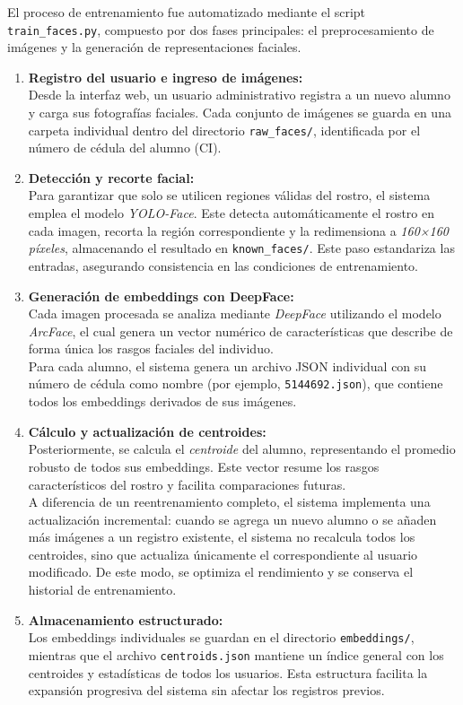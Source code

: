 El proceso de entrenamiento fue automatizado mediante el script \texttt{train\_faces.py}, compuesto por dos fases principales: el preprocesamiento de imágenes y la generación de representaciones faciales.

\begin{enumerate}
    \item \textbf{Registro del usuario e ingreso de imágenes:} \\
    Desde la interfaz web, un usuario administrativo registra a un nuevo alumno y carga sus fotografías faciales. Cada conjunto de imágenes se guarda en una carpeta individual dentro del directorio \texttt{raw\_faces/}, identificada por el número de cédula del alumno (CI).

    \item \textbf{Detección y recorte facial:} \\
    Para garantizar que solo se utilicen regiones válidas del rostro, el sistema emplea el modelo \textit{YOLO-Face}. Este detecta automáticamente el rostro en cada imagen, recorta la región correspondiente y la redimensiona a \textit{160×160 píxeles}, almacenando el resultado en \texttt{known\_faces/}. Este paso estandariza las entradas, asegurando consistencia en las condiciones de entrenamiento.

    \item \textbf{Generación de embeddings con DeepFace:} \\
    Cada imagen procesada se analiza mediante \textit{DeepFace} utilizando el modelo \textit{ArcFace}, el cual genera un vector numérico de características que describe de forma única los rasgos faciales del individuo. \\
    Para cada alumno, el sistema genera un archivo JSON individual con su número de cédula como nombre (por ejemplo, \texttt{5144692.json}), que contiene todos los embeddings derivados de sus imágenes.

    \item \textbf{Cálculo y actualización de centroides:} \\
    Posteriormente, se calcula el \textit{centroide} del alumno, representando el promedio robusto de todos sus embeddings. Este vector resume los rasgos característicos del rostro y facilita comparaciones futuras. \\
    A diferencia de un reentrenamiento completo, el sistema implementa una actualización incremental: cuando se agrega un nuevo alumno o se añaden más imágenes a un registro existente, el sistema no recalcula todos los centroides, sino que actualiza únicamente el correspondiente al usuario modificado. De este modo, se optimiza el rendimiento y se conserva el historial de entrenamiento.

    \item \textbf{Almacenamiento estructurado:} \\
    \sloppy
    Los embeddings individuales se guardan en el directorio \texttt{embeddings/}, mientras que el archivo \texttt{centroids.json} mantiene un índice general con los centroides y estadísticas de todos los usuarios. Esta estructura facilita la expansión progresiva del sistema sin afectar los registros previos.
\end{enumerate}


